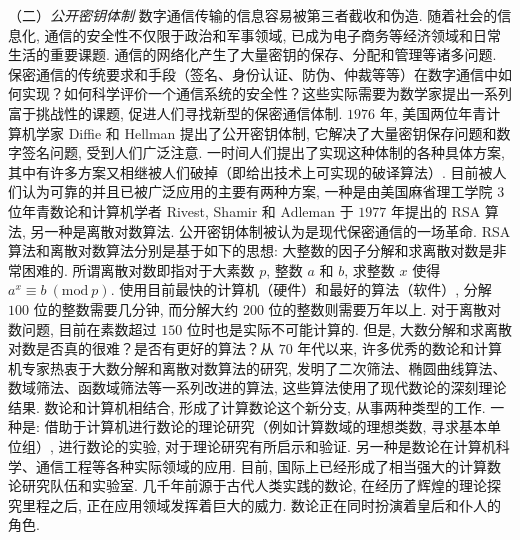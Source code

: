（二）\emph{公开密钥体制} 数字通信传输的信息容易被第三者截收和伪造. 随着社会的信息化, 通信的安全性不仅限于政治和军事领域, 已成为电子商务等经济领域和日常生活的重要课题. 通信的网络化产生了大量密钥的保存、分配和管理等诸多问题. 保密通信的传统要求和手段（签名、身份认证、防伪、仲裁等等）在数字通信中如何实现？如何科学评价一个通信系统的安全性？这些实际需要为数学家提出一系列富于挑战性的课题, 促进人们寻找新型的保密通信体制. $1976$ 年, 美国两位年青计算机学家 Diffie 和 Hellman 提出了公开密钥体制, 它解决了大量密钥保存问题和数字签名问题, 受到人们广泛注意. 一时间人们提出了实现这种体制的各种具体方案, 其中有许多方案又相继被人们破掉（即给出技术上可实现的破译算法）. 目前被人们认为可靠的并且已被广泛应用的主要有两种方案, 一种是由美国麻省理工学院 $3$ 位年青数论和计算机学者 Rivest, Shamir 和 Adleman 于 $1977$ 年提出的 RSA 算法, 另一种是离散对数算法. 公开密钥体制被认为是现代保密通信的一场革命. RSA 算法和离散对数算法分别是基于如下的思想: 大整数的因子分解和求离散对数是非常困难的. 所谓离散对数即指对于大素数 $p$, 整数 $a$ 和 $b$, 求整数 $x$ 使得 $a^x\equiv b\ (\mathrm{mod}\ p)$. 使用目前最快的计算机（硬件）和最好的算法（软件）, 分解 $100$ 位的整数需要几分钟, 而分解大约 $200$ 位的整数则需要万年以上. 对于离散对数问题, 目前在素数超过 $150$ 位时也是实际不可能计算的. 但是, 大数分解和求离散对数是否真的很难？是否有更好的算法？从 $70$ 年代以来, 许多优秀的数论和计算机专家热衷于大数分解和离散对数算法的研究, 发明了二次筛法、椭圆曲线算法、数域筛法、函数域筛法等一系列改进的算法, 这些算法使用了现代数论的深刻理论结果. 数论和计算机相结合, 形成了计算数论这个新分支, 从事两种类型的工作. 一种是: 借助于计算机进行数论的理论研究（例如计算数域的理想类数, 寻求基本单位组）, 进行数论的实验, 对于理论研究有所启示和验证. 另一种是数论在计算机科学、通信工程等各种实际领域的应用. 目前, 国际上已经形成了相当强大的计算数论研究队伍和实验室. 几千年前源于古代人类实践的数论, 在经历了辉煌的理论探究里程之后, 正在应用领域发挥着巨大的威力. 数论正在同时扮演着皇后和仆人的角色.
